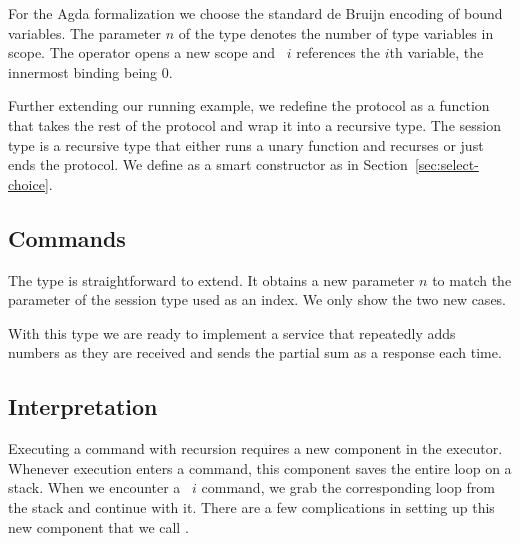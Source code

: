 \documentclass[acmsmall,screen,anonymous,review]{acmart}
\begin{document}
For the Agda formalization we choose the standard de Bruijn encoding
of bound variables. The parameter $n$ of
the {\ASession} type denotes the number of type variables in
scope. The {\Amu} operator opens a new scope and {\Aback~$i$}
references the $i$th variable, the innermost binding being $0$.
\rstSession

Further extending our running example, we redefine the protocol {\Aunaryp} as a function
that takes the rest of the protocol and wrap it into a recursive
type. The session type {\Amanyunaryp} is a recursive type that either
runs a unary function and recurses or just ends the protocol. We
define {\Aamp} as a smart constructor as in Section~\ref{sec:select-choice}.
\rstExampleManyUnaryp

\subsection{Commands}
\label{sec:commands}



The {\ACommand} type is straightforward to extend. It obtains a new
parameter $n$ to match the parameter of the session type used as an
index. We only show the two new cases.
\rstCommand

With this type we are ready to implement a
service that repeatedly adds numbers as they are received and sends the partial
sum as a response each time.
\rstSumupCommand

\subsection{Interpretation}
\label{sec:interpretaion}


Executing a command with recursion requires a new component in the
executor. Whenever execution enters a {\AMU} command, this component
saves the entire loop on a stack. When we encounter a {\ACONTINUE~$i$}
command, we grab the corresponding loop from the stack and
continue with it. There are a few complications in setting up this new
component that we call {\ACommandStore}.
\end{document}
